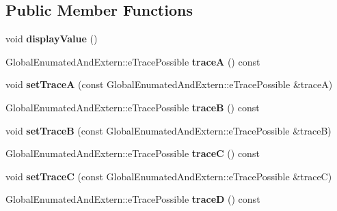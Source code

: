 \subsection*{Public Member Functions}
\begin{DoxyCompactItemize}
\item 
\mbox{\label{class_trigger_functions_aeec40db3451d98d959c26292d9b4735d}} 
void {\bfseries display\+Value} ()
\item 
\mbox{\label{class_trigger_functions_a20eb28f671261fde2341ea781572f97b}} 
Global\+Enumated\+And\+Extern\+::e\+Trace\+Possible {\bfseries traceA} () const
\item 
\mbox{\label{class_trigger_functions_a43b048f63e1a701ec4fde50d65d69be5}} 
void {\bfseries set\+TraceA} (const Global\+Enumated\+And\+Extern\+::e\+Trace\+Possible \&traceA)
\item 
\mbox{\label{class_trigger_functions_a9b53479e19376b62ba63617623934d4e}} 
Global\+Enumated\+And\+Extern\+::e\+Trace\+Possible {\bfseries traceB} () const
\item 
\mbox{\label{class_trigger_functions_a1380c7eb3b60bdce342d3b140fac927b}} 
void {\bfseries set\+TraceB} (const Global\+Enumated\+And\+Extern\+::e\+Trace\+Possible \&traceB)
\item 
\mbox{\label{class_trigger_functions_a62be647923d0b5991dc1a9a419df868a}} 
Global\+Enumated\+And\+Extern\+::e\+Trace\+Possible {\bfseries traceC} () const
\item 
\mbox{\label{class_trigger_functions_ab1f00924e917907745c20efdd563f013}} 
void {\bfseries set\+TraceC} (const Global\+Enumated\+And\+Extern\+::e\+Trace\+Possible \&traceC)
\item 
\mbox{\label{class_trigger_functions_a46ca04080c0785919613e5dc05523b3c}} 
Global\+Enumated\+And\+Extern\+::e\+Trace\+Possible {\bfseries traceD} () const
\item 
\mbox{\label{class_trigger_functions_a45a423c27a202bbf76c11c420a161e60}} 

\end{DoxyCompactItemize}
